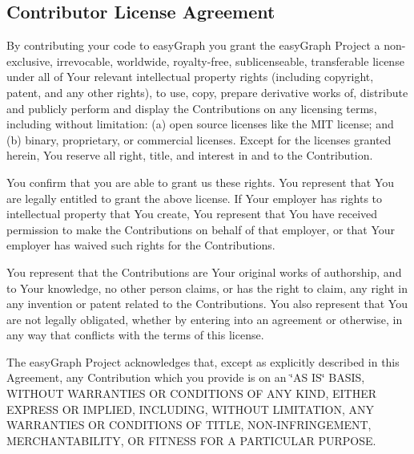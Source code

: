 \subsection*{Contributor License Agreement}

By contributing your code to easy\+Graph you grant the easy\+Graph Project a non-\/exclusive, irrevocable, worldwide, royalty-\/free, sublicenseable, transferable license under all of Your relevant intellectual property rights (including copyright, patent, and any other rights), to use, copy, prepare derivative works of, distribute and publicly perform and display the Contributions on any licensing terms, including without limitation\+: (a) open source licenses like the M\+IT license; and (b) binary, proprietary, or commercial licenses. Except for the licenses granted herein, You reserve all right, title, and interest in and to the Contribution.

You confirm that you are able to grant us these rights. You represent that You are legally entitled to grant the above license. If Your employer has rights to intellectual property that You create, You represent that You have received permission to make the Contributions on behalf of that employer, or that Your employer has waived such rights for the Contributions.

You represent that the Contributions are Your original works of authorship, and to Your knowledge, no other person claims, or has the right to claim, any right in any invention or patent related to the Contributions. You also represent that You are not legally obligated, whether by entering into an agreement or otherwise, in any way that conflicts with the terms of this license.

The easy\+Graph Project acknowledges that, except as explicitly described in this Agreement, any Contribution which you provide is on an \char`\"{}\+A\+S I\+S\char`\"{} B\+A\+S\+IS, W\+I\+T\+H\+O\+UT W\+A\+R\+R\+A\+N\+T\+I\+ES OR C\+O\+N\+D\+I\+T\+I\+O\+NS OF A\+NY K\+I\+ND, E\+I\+T\+H\+ER E\+X\+P\+R\+E\+SS OR I\+M\+P\+L\+I\+ED, I\+N\+C\+L\+U\+D\+I\+NG, W\+I\+T\+H\+O\+UT L\+I\+M\+I\+T\+A\+T\+I\+ON, A\+NY W\+A\+R\+R\+A\+N\+T\+I\+ES OR C\+O\+N\+D\+I\+T\+I\+O\+NS OF T\+I\+T\+LE, N\+O\+N-\/\+I\+N\+F\+R\+I\+N\+G\+E\+M\+E\+NT, M\+E\+R\+C\+H\+A\+N\+T\+A\+B\+I\+L\+I\+TY, OR F\+I\+T\+N\+E\+SS F\+OR A P\+A\+R\+T\+I\+C\+U\+L\+AR P\+U\+R\+P\+O\+SE. 